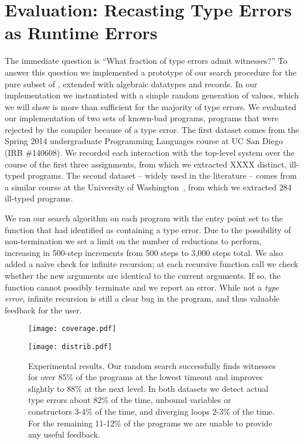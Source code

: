 \section{Evaluation: Recasting Type Errors as Runtime Errors}
\label{sec:eval-witness}
%
The immediate question is ``What fraction of type errors admit
witnesses?''
%
To answer this question we implemented a prototype of our search
procedure for the pure subset of \ocaml, \ie \lang extended with
algebraic datatypes and records. 
%
In our implementation we instantiated \gensym with a simple random
generation of values, which we will show is more than sufficient for the
majority of type errors.
%
We evaluated our implementation of two sets of known-bad programs, \ie
programs that were rejected by the \ocaml compiler because of a type
error.
%
The first dataset comes from the Spring 2014 undergraduate Programming
Languages course at UC San Diego (IRB \#140608). 
%
We recorded each interaction with the \ocaml top-level system over the
course of the first three assignments, from which we extracted XXXX
distinct, ill-typed \ocaml programs.
%
The second dataset -- widely used in the literature -- comes from a
similar course at the University of
Washington~\cite{Lerner2006-pj}, from which we extracted 284
ill-typed programs.

We ran our search algorithm on each program with the entry point set to
the function that \ocaml had identified as containing a type error. 
%
Due to the possibility of non-termination we set a limit on the number
of reductions to perform, increasing in 500-step increments from 500
steps to 3,000 steps total.
%
We also added a na\"ive check for infinite recursion; at each recursive
function call we check whether the new arguments are identical to the
current arguments.
%
If so, the function cannot possibly terminate and we report an error.
%
While not a \emph{type error}, infinite recursion is still a clear bug
in the program, and thus valuable feedback for the user.

\begin{figure}[t]
\centering
\begin{minipage}{\linewidth}
\texttt{[image: coverage.pdf]}
\end{minipage}
\begin{minipage}{\linewidth}
\texttt{[image: distrib.pdf]}
\end{minipage}
\caption{Experimental results. Our random search successfully finds
  witnesses for over 85\% of the programs at the lowest timeout and
  improves slightly to 88\% at the next level. In both datasets we
  detect actual type errors about 82\% of the time, unbound variables or
  constructors 3-4\% of the time, and diverging loops 2-3\% of the
  time. For the remaining 11-12\% of the programs we are unable to
  provide any useful feedback. 
}
\label{fig:results-witness}
\end{figure}

